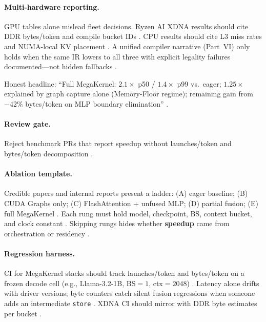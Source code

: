 \paragraph{Multi-hardware reporting.} GPU tables alone mislead fleet decisions. Ryzen AI XDNA results should cite DDR bytes/token and compile bucket IDs \citep{amd2024xdna,amd2024aie}. CPU results should cite L3 miss rates and NUMA-local KV placement \citep{dlbook,patel2025llminference}. A unified compiler narrative (Part~VI) only holds when the same IR lowers to all three with explicit legality failures documented---not hidden fallbacks \citep{yirage2026,chen2020compilerbasedhardw}.

\begin{example}
Honest headline: ``Full MegaKernel: $2.1\times$ p50 / $1.4\times$ p99 vs.\ eager; $1.25\times$ explained by graph capture alone (Memory-Floor regime); remaining gain from $-42\%$ bytes/token on MLP boundary elimination'' \citep{memoryfloor2026,taxbreak2026}.
\end{example}

\paragraph{Review gate.} Reject benchmark PRs that report speedup without launches/token and bytes/token decomposition \citep{taxbreak2026,memoryfloor2026,patel2025llminference}.

\paragraph{Ablation template.} Credible papers and internal reports present a ladder: (A) eager baseline; (B) CUDA Graphs only; (C) FlashAttention + unfused MLP; (D) partial fusion; (E) full MegaKernel \citep{memoryfloor2026,dao2022flashattention,taxbreak2026}. Each rung must hold model, checkpoint, BS, context bucket, and clock constant \citep{patel2025llminference,nvidia2024cudagraphs}. Skipping rungs hides whether \textbf{speedup} came from orchestration or residency \citep{memoryfloor2026}.

\paragraph{Regression harness.} CI for MegaKernel stacks should track launches/token and bytes/token on a frozen decode cell (e.g., Llama-3.2-1B, BS${=}1$, ctx${=}2048$) \citep{taxbreak2026,yirage2026}. Latency alone drifts with driver versions; byte counters catch silent fusion regressions when someone adds an intermediate \texttt{store} \citep{memoryfloor2026,chen2020compilerbasedhardw}. XDNA CI should mirror with DDR byte estimates per bucket \citep{amd2024xdna,amd2024aie}.

